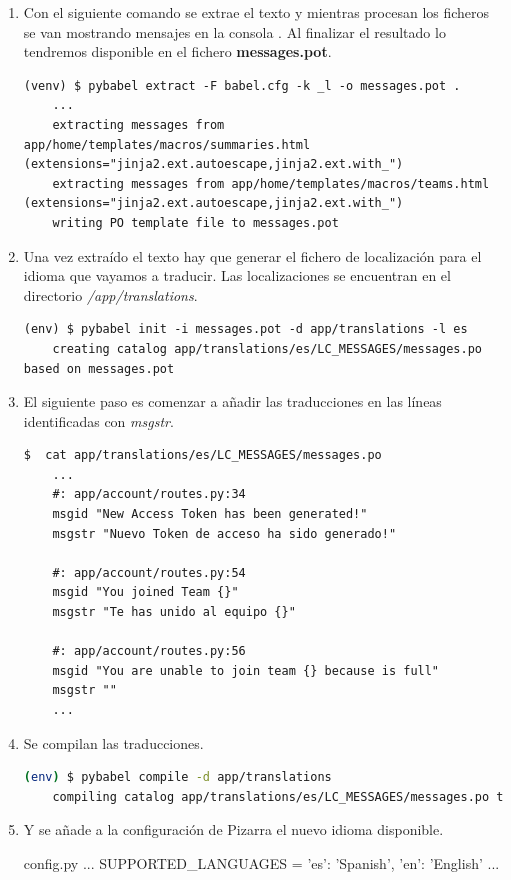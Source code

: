 \documentclass[11pt,spanish,listoffigures,listoftables]{tfgetsinf}
\begin{document}
\begin{enumerate}
	\item Con el siguiente comando se extrae el texto y mientras procesan los ficheros se van mostrando mensajes en la consola . Al finalizar el resultado lo tendremos disponible en el fichero \mbox{\textbf{messages.pot}}.
	
	\begin{lstlisting}[style=ascii-tree]
	(venv) $ pybabel extract -F babel.cfg -k _l -o messages.pot .
	...
	extracting messages from app/home/templates/macros/summaries.html (extensions="jinja2.ext.autoescape,jinja2.ext.with_")
	extracting messages from app/home/templates/macros/teams.html (extensions="jinja2.ext.autoescape,jinja2.ext.with_")
	writing PO template file to messages.pot
	\end{lstlisting}
	
	\item Una vez extraído el texto hay que generar el fichero de localización para el idioma que vayamos a traducir. Las localizaciones se encuentran en el directorio \textit{/app/translations}. 
	
	\begin{lstlisting}[style=ascii-tree]
	(env) $ pybabel init -i messages.pot -d app/translations -l es
	creating catalog app/translations/es/LC_MESSAGES/messages.po based on messages.pot
	\end{lstlisting}
	
	\item El siguiente paso es comenzar a añadir las traducciones en las líneas identificadas con \textit{msgstr}.
	
	\begin{lstlisting}[style=ascii-tree]
	$  cat app/translations/es/LC_MESSAGES/messages.po
	...
	#: app/account/routes.py:34
	msgid "New Access Token has been generated!"
	msgstr "Nuevo Token de acceso ha sido generado!"
	
	#: app/account/routes.py:54
	msgid "You joined Team {}"
	msgstr "Te has unido al equipo {}"
	
	#: app/account/routes.py:56
	msgid "You are unable to join team {} because is full"
	msgstr ""
	...
	\end{lstlisting}
	
	\item Se compilan las traducciones.
	
	\begin{lstlisting}[language=bash]
	(env) $ pybabel compile -d app/translations
	compiling catalog app/translations/es/LC_MESSAGES/messages.po to app/translations/es/LC_MESSAGES/messages.mo
	\end{lstlisting}
	
	\item Y se añade a la configuración de Pizarra el nuevo idioma disponible.
	
	\begin{code}{config.py}
		...
		SUPPORTED_LANGUAGES = {'es': 'Spanish', 'en': 'English'}
		...
	\end{code}
	
\end{enumerate}
\end{document}
